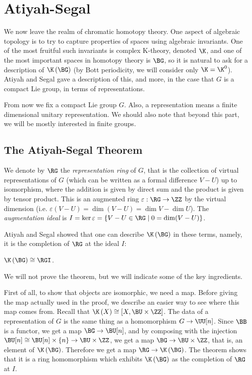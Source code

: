 \section{Atiyah-Segal}

We now leave the realm of chromatic homotopy theory.
One aspect of algebraic topology is to try to capture properties of spaces using algebraic invariants.
One of the most fruitful such invariants is complex K-theory, denoted $\K$, and one of the most important spaces in homotopy theory is $\BG$, so it is natural to ask for a description of $\K\left(\BG\right)$ (by Bott periodicity, we will consider only $\K = \K^0$).
Atiyah and Segal \cite{AS} gave a description of this, and more, in the case that $G$ is a compact Lie group, in terms of representations.

From now we fix a compact Lie group $G$.
Also, a representation means a finite dimensional unitary representation.
We should also note that beyond this part, we will be mostly interested in finite groups.



\subsection{The Atiyah-Segal Theorem}

We denote by $\RG$ the \emph{representation ring} of $G$, that is the collection of virtual representations of $G$ (which can be written as a formal difference $V - U$) up to isomorphism, where the addition is given by direct sum and the product is given by tensor product.
This is an augmented ring $\varepsilon: \RG \to \ZZ$ by the virtual dimension (i.e. $\varepsilon\left(V-U\right) = \dim\left(V-U\right) = \dim V - \dim U$).
The \emph{augmentation ideal} is $I = \ker \varepsilon = \left\{ V - U \in \RG \mid 0 = \dim(V-U) \right\}$.

Atiyah and Segal showed that one can describe $\K\left(\BG\right)$ in these terms, namely, it is the completion of $\RG$ at the ideal $I$:

\begin{theorem}[{\cite{AS}}]
	$\K\left(\BG\right) \cong \RGI$.
\end{theorem}

We will not prove the theorem, but we will indicate some of the key ingredients.

First of all, to show that objects are isomorphic, we need a map.
Before giving the map actually used in the proof, we describe an easier way to see where this map comes from.
Recall that $\K\left(X\right) \cong \left[X, \BU \times \ZZ\right]$.
The data of a representation of $G$ is the same thing as a homomorphism $G \to \UU[n]$.
Since $\BB$ is a functor, we get a map $\BG \to \BU[n]$, and by composing with the injection $\BU[n] \cong \BU[n] \times \left\{n\right\} \to \BU \times \ZZ$, we get a map $\BG \to \BU \times \ZZ$, that is, an element of $\K\left(\BG\right)$.
Therefore we get a map $\RG \to \K\left(\BG\right)$.
The theorem shows that it is a ring homomorphism which exhibits $\K\left(\BG\right)$ as the completion of $\RG$ at $I$.

